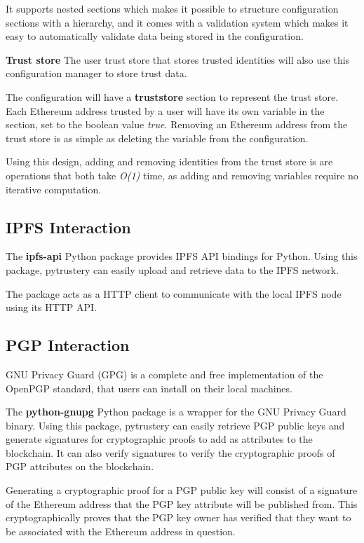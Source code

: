 \documentclass[12pt]{report}
\begin{document}
	It supports nested sections which makes it possible to structure configuration sections with a hierarchy, and it comes with a validation system which makes it easy to automatically validate data being stored in the configuration.\cite{19}
	
	\bigskip
	\noindent \textbf{Trust store}\newline
	The user trust store that stores trusted identities will also use this configuration manager to store trust data.
	
	The configuration will have a \textbf{truststore} section to represent the trust store. Each Ethereum address trusted by a user will have its own variable in the section, set to the boolean value \textit{true}. Removing an Ethereum address from the trust store is as simple as deleting the variable from the configuration.
	
	Using this design, adding and removing identities from the trust store is are operations that both take \textit{O(1)} time, as adding and removing variables require no iterative computation.
	
	\subsection{IPFS Interaction}
	The \textbf{ipfs-api} Python package provides IPFS API bindings for Python\cite{20}. Using this package, pytrustery can easily upload and retrieve data to the IPFS network.
	
	The package acts as a HTTP client to communicate with the local IPFS node using its HTTP API.
	
	\subsection{PGP Interaction}
	GNU Privacy Guard (GPG) is a complete and free implementation of the OpenPGP standard, that users can install on their local machines.\cite{22}	
	
	The \textbf{python-gnupg} Python package is a wrapper for the GNU Privacy Guard binary.\cite{21} Using this package, pytrustery can easily retrieve PGP public keys and generate signatures for cryptographic proofs to add as attributes to the blockchain. It can also verify signatures to verify the cryptographic proofs of PGP attributes on the blockchain.
	
	Generating a cryptographic proof for a PGP public key will consist of a signature of the Ethereum address that the PGP key attribute will be published from. This cryptographically proves that the PGP key owner has verified that they want to be associated with the Ethereum address in question.
	
\end{document}
